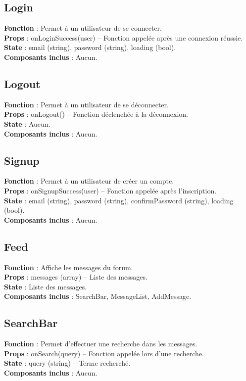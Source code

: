 \documentclass{article}
\begin{document}
\subsection*{Login}
\textbf{Fonction} : Permet à un utilisateur de se connecter.\\
\textbf{Props} : onLoginSuccess(user) – Fonction appelée après une connexion réussie.\\
\textbf{State} : email (string), password (string), loading (bool).\\
\textbf{Composants inclus} : Aucun.

\subsection*{Logout}
\textbf{Fonction} : Permet à un utilisateur de se déconnecter.\\
\textbf{Props} : onLogout() – Fonction déclenchée à la déconnexion.\\
\textbf{State} : Aucun.\\
\textbf{Composants inclus} : Aucun.

\subsection*{Signup}
\textbf{Fonction} : Permet à un utilisateur de créer un compte.\\
\textbf{Props} : onSignupSuccess(user) – Fonction appelée après l'inscription.\\
\textbf{State} : email (string), password (string), confirmPassword (string), loading (bool).\\
\textbf{Composants inclus} : Aucun.

\subsection*{Feed}
\textbf{Fonction} : Affiche les messages du forum.\\
\textbf{Props} : messages (array) – Liste des messages.\\
\textbf{State} : Liste des messages.\\
\textbf{Composants inclus} : SearchBar, MessageList, AddMessage.

\subsection*{SearchBar}
\textbf{Fonction} : Permet d’effectuer une recherche dans les messages.\\
\textbf{Props} : onSearch(query) – Fonction appelée lors d’une recherche.\\
\textbf{State} : query (string) – Terme recherché.\\
\textbf{Composants inclus} : Aucun.
\end{document}
